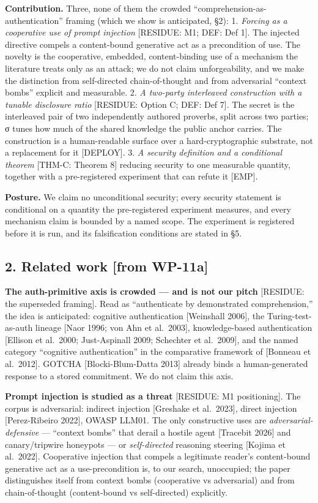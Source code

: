 \documentclass[
  11pt,
]{article}
\newcounter{none} %
\begin{document}
\textbf{Contribution.} Three, none of them the crowded
``comprehension-as-authentication'' framing (which we show is
anticipated, §2): 1. \emph{Forcing as a cooperative use of prompt
injection} {[}RESIDUE: M1; DEF: Def 1{]}. The injected directive compels
a content-bound generative act as a precondition of use. The novelty is
the cooperative, embedded, content-binding use of a mechanism the
literature treats only as an attack; we do not claim unforgeability, and
we make the distinction from self-directed chain-of-thought and from
adversarial ``context bombs'' explicit and measurable. 2. \emph{A
two-party interleaved construction with a tunable disclosure ratio}
{[}RESIDUE: Option C; DEF: Def 7{]}. The secret is the interleaved pair
of two independently authored proverbs, split across two parties; σ
tunes how much of the shared knowledge the public anchor carries. The
construction is a human-readable surface over a hard-cryptographic
substrate, not a replacement for it {[}DEPLOY{]}. 3. \emph{A security
definition and a conditional theorem} {[}THM-C: Theorem 8{]} reducing
security to one measurable quantity, together with a pre-registered
experiment that can refute it {[}EMP{]}.

\textbf{Posture.} We claim no unconditional security; every security
statement is conditional on a quantity the pre-registered experiment
measures, and every mechanism claim is bounded by a named scope. The
experiment is registered before it is run, and its falsification
conditions are stated in §5.

\subsection{2. Related work {[}from
WP-11a{]}}\label{related-work-from-wp-11a}

\textbf{The auth-primitive axis is crowded --- and is not our pitch}
{[}RESIDUE: the superseded framing{]}. Read as ``authenticate by
demonstrated comprehension,'' the idea is anticipated: cognitive
authentication {[}Weinshall 2006{]}, the Turing-test-as-auth lineage
{[}Naor 1996; von Ahn et al.~2003{]}, knowledge-based authentication
{[}Ellison et al.~2000; Just-Aspinall 2009; Schechter et al.~2009{]},
and the named category ``cognitive authentication'' in the comparative
framework of {[}Bonneau et al.~2012{]}. GOTCHA {[}Blocki-Blum-Datta
2013{]} already binds a human-generated response to a stored commitment.
We do not claim this axis.

\textbf{Prompt injection is studied as a threat} {[}RESIDUE: M1
positioning{]}. The corpus is adversarial: indirect injection
{[}Greshake et al.~2023{]}, direct injection {[}Perez-Ribeiro 2022{]},
OWASP LLM01. The only constructive uses are \emph{adversarial-defensive}
--- ``context bombs'' that derail a hostile agent {[}Tracebit 2026{]}
and canary/tripwire honeypots --- or \emph{self-directed} reasoning
steering {[}Kojima et al.~2022{]}. Cooperative injection that compels a
legitimate reader's content-bound generative act as a use-precondition
is, to our search, unoccupied; the paper distinguishes itself from
context bombs (cooperative vs adversarial) and from chain-of-thought
(content-bound vs self-directed) explicitly.
\end{document}
